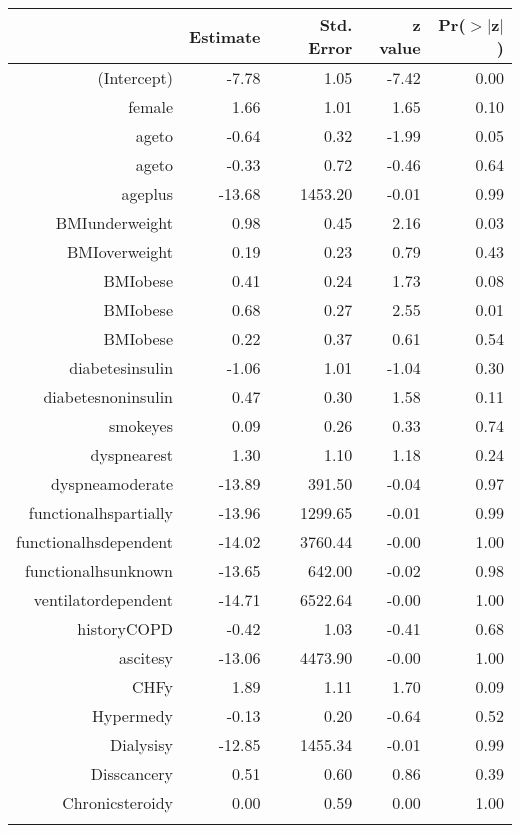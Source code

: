\bigskip\bigskip
\centering
\begin{tabular}{rrrrr}
  \hline
 & Estimate & Std. Error & z value & Pr($>$$|$z$|$) \\ 
  \hline
(Intercept) & -7.78 & 1.05 & -7.42 & 0.00 \\ 
  female & 1.66 & 1.01 & 1.65 & 0.10 \\ 
  age\-65\-to\-74 & -0.64 & 0.32 & -1.99 & 0.05 \\ 
  age\-75\-to\-84 & -0.33 & 0.72 & -0.46 & 0.64 \\ 
  age\-85\-plus & -13.68 & 1453.20 & -0.01 & 0.99 \\ 
  BMI\-underweight & 0.98 & 0.45 & 2.16 & 0.03 \\ 
  BMI\-overweight & 0.19 & 0.23 & 0.79 & 0.43 \\ 
  BMI\-obese\-1 & 0.41 & 0.24 & 1.73 & 0.08 \\ 
  BMI\-obese\-2 & 0.68 & 0.27 & 2.55 & 0.01 \\ 
  BMI\-obese\-3 & 0.22 & 0.37 & 0.61 & 0.54 \\ 
  diabetes\-insulin & -1.06 & 1.01 & -1.04 & 0.30 \\ 
  diabetes\-noninsulin & 0.47 & 0.30 & 1.58 & 0.11 \\ 
  smoke\-yes & 0.09 & 0.26 & 0.33 & 0.74 \\ 
  dyspnea\-rest & 1.30 & 1.10 & 1.18 & 0.24 \\ 
  dyspnea\-moderate & -13.89 & 391.50 & -0.04 & 0.97 \\ 
  functional\-hs\-partially & -13.96 & 1299.65 & -0.01 & 0.99 \\ 
  functional\-hs\-dependent & -14.02 & 3760.44 & -0.00 & 1.00 \\ 
  functional\-hs\-unknown & -13.65 & 642.00 & -0.02 & 0.98 \\ 
  ventilator\-dependent & -14.71 & 6522.64 & -0.00 & 1.00 \\ 
  history\-COPD & -0.42 & 1.03 & -0.41 & 0.68 \\ 
  ascites\-y & -13.06 & 4473.90 & -0.00 & 1.00 \\ 
  CHF\-y & 1.89 & 1.11 & 1.70 & 0.09 \\ 
  Hyper\-med\-y & -0.13 & 0.20 & -0.64 & 0.52 \\ 
  Dialysis\-y & -12.85 & 1455.34 & -0.01 & 0.99 \\ 
  Diss\-cancer\-y & 0.51 & 0.60 & 0.86 & 0.39 \\ 
  Chronic\-steroid\-y & 0.00 & 0.59 & 0.00 & 1.00 \\ 
$$
\end{tabular}
